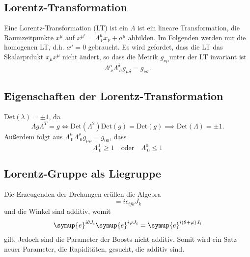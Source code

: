 \documentclass[
  captions=tableheading,  %
  titlepage=firstiscover, %
]{scrartcl}
\begin{document}
\subsection{Lorentz-Transformation}
Eine Lorentz-Transformation (LT) ist ein $\Lambda$ ist ein lineare Transformation, die 
Raumzeitpunkte $x^{\mu}$  auf  $x^{\mu ' } = \Lambda_{\; \nu}^{\mu} x_{\nu} + a^{\mu}$ abbilden.
Im Folgenden werden nur die homogenen LT, d.h. $a^{\mu} = 0$ gebraucht.
Es wird gefordet, dass die LT das Skalarprdukt $x_{\mu}x^{\mu}$ nicht ändert, so dass die Metrik $g_{\nu \mu}$unter 
der LT invariant ist 
\begin{equation*}
  \Lambda_{\; \nu}^{\mu} \Lambda_{\; \sigma}^{\delta} g_{\mu \delta} = g_{\nu \sigma}.
\end{equation*}
\subsection{Eigenschaften der Lorentz-Transformation}
$\text{Det}(\lambda) = \pm 1$, da 
\begin{equation*}
  \Lambda g \Lambda^T = g \iff \text{Det}(\Lambda^2) \text{Det}(g) = \text{Det}(g) \implies 
  \text{Det}(\Lambda) = \pm 1.
\end{equation*}
Außerdem folgt aus $\Lambda_{\; 0}^{\mu} \Lambda_{\; 0}^{\rho} g_{\mu \rho} = g_{0 0}$, dass 
\begin{equation*}
  \Lambda_{\; 0}^{0} \geq 1 \quad \text{oder} \quad \Lambda_{\; 0}^{0} \leq 1 
\end{equation*}
\subsection{Lorentz-Gruppe als Liegruppe}
Die Erzeugenden der Drehungen erüllen die Algebra 
\begin{equation*}
  [J_i, J_j] = i \epsilon_{ijk} J_k
\end{equation*}
und die Winkel sind additiv, womit 
\begin{equation*}
  \symup{e}^{i\theta J_i} \symup{e}^{i\varphi J_i} = \symup{e}^{i(\theta + \varphi) J_i}
\end{equation*}
gilt. 
Jedoch sind die Parameter der Boosts nicht additiv. 
Somit wird ein Satz neuer Parameter, die Rapiditäten, gesucht, die additiv sind.
\end{document}
